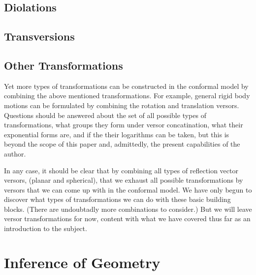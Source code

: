 \documentclass[12pt]{article}
\begin{document}
\subsection{Diolations}


\subsection{Transversions}




\subsection{Other Transformations}

Yet more types of transformations can be constructed in the conformal model
by combining the above mentioned transformations.  For example, general
rigid body motions can be formulated by combining the rotation and translation
versors.  Questions should be answered about the set of all possible types
of transformations, what groups they form under versor concatination, what
their exponential forms are, and if the their logarithms can be taken, but
this is beyond the scope of this paper and, admittedly, the present capabilities of the author.

In any case, it should be clear that by combining all types of reflection vector versors, (planar and spherical),
that we exhaust all possible transformations by versors that we can come up with in the
conformal model.  We have only begun to discover what types of transformations we
can do with these basic building blocks.  (There are undoubtadly more combinations to
consider.)  But we will leave versor transformations for now, content with what we have
covered thus far as an introduction to the subject.

\section{Inference of Geometry}
\end{document}
